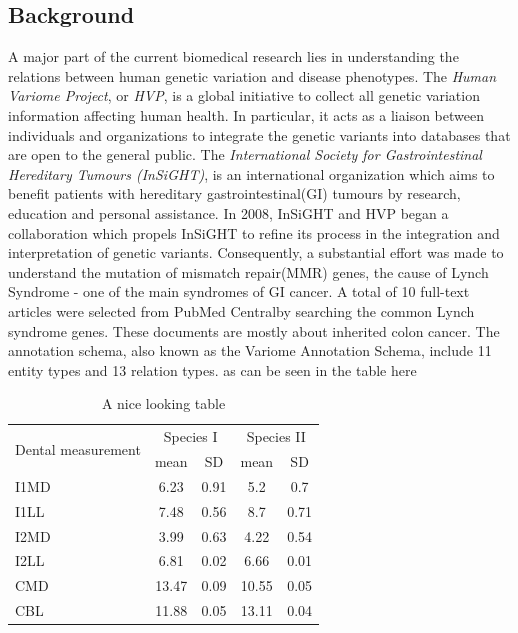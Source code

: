 \subsection{Background}
A major part of the current biomedical research lies in understanding the relations between human genetic variation and disease phenotypes. The \emph{Human Variome Project}, or \emph{HVP}, is a global initiative to collect all genetic variation information affecting human health\cite{ring2006human}. In particular, it acts as a liaison between individuals and organizations to integrate the genetic variants into databases that are open to the general public\cite{verspoor2013annotating}. The \emph{International Society for Gastrointestinal Hereditary Tumours (InSiGHT)}, is an international organization which aims to benefit patients with hereditary gastrointestinal(GI) tumours by research, education and personal assistance. In 2008, InSiGHT and HVP began a collaboration which propels InSiGHT to refine its process in the integration and interpretation of genetic variants. Consequently, a substantial effort was made to understand the mutation of mismatch repair(MMR) genes, the cause of Lynch Syndrome - one of the main syndromes of GI cancer\cite{silva2009mismatch}. A total of 10 full-text articles were selected from PubMed Central\textregistered  by searching the common Lynch syndrome genes. These documents are mostly about inherited colon cancer. The annotation schema, also known as the Variome Annotation Schema\cite{verspoor2013annotating}, include 11 entity types and 13 relation types. as can be seen in the table here
\begin{table}
	\caption{A nice looking table}
	\centering
	\label{table:nice_table}
	\begin{tabular}{l c c c c}
		\hline 
		\multirow{2}{*}{Dental measurement} & \multicolumn{2}{c}{Species I} & \multicolumn{2}{c}{Species II} \\ 
		\cline{2-5}
		& mean & SD  & mean & SD  \\ 
		\hline
		I1MD & 6.23 & 0.91 & 5.2  & 0.7  \\
		
		I1LL & 7.48 & 0.56 & 8.7  & 0.71 \\
		
		I2MD & 3.99 & 0.63 & 4.22 & 0.54 \\
		
		I2LL & 6.81 & 0.02 & 6.66 & 0.01 \\
		
		CMD & 13.47 & 0.09 & 10.55 & 0.05 \\
		
		CBL & 11.88 & 0.05 & 13.11 & 0.04\\ 
		\hline 
	\end{tabular}
\end{table}

